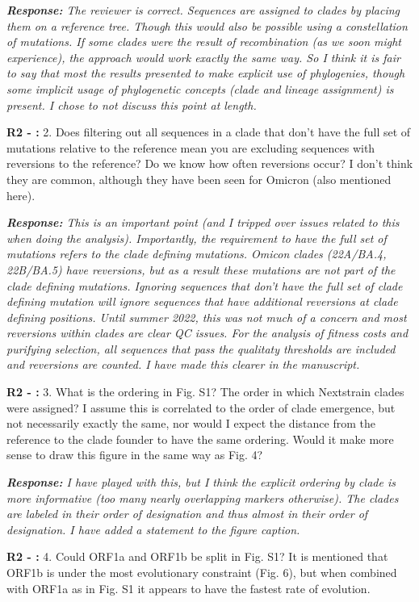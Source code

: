 \documentclass[aps,rmp,onecolumn]{revtex4-1}
\newcounter{counter1}[section]
\newcounter{counter2}[section]
\newcounter{counter3}[section]
\newcommand{\refb}[1]{\vskip 5mm \textbf{R2 - \stepcounter{counter2}\arabic{counter2}:} #1}
\newcommand{\response}[1]{{\it {\color{response}\textbf{Response:} #1}}\vskip 5mm}
\begin{document}
\response{The reviewer is correct. Sequences are assigned to clades by placing them on a reference tree.
Though this would also be possible using a constellation of mutations. If some clades were the result of recombination (as we soon might experience), the approach would work exactly the same way. So I think it is fair to say that most the results presented to make explicit use of phylogenies, though some implicit usage of phylogenetic concepts (clade and lineage assignment) is present. I chose to not discuss this point at length.  }

\refb{2. Does filtering out all sequences in a clade that don't have the full set of mutations relative to the reference mean you are excluding sequences with reversions to the reference? Do we know how often reversions occur? I don't think they are common, although they have been seen for Omicron (also mentioned here).}

\response{This is an important point (and I tripped over issues related to this when doing the analysis). Importantly, the requirement to have the full set of mutations refers to the clade defining mutations. Omicon clades (22A/BA.4, 22B/BA.5) have reversions, but as a result these mutations are not part of the clade defining mutations. Ignoring sequences that don't have the full set of clade defining mutation will ignore sequences that have additional reversions at clade defining positions. Until summer 2022, this was not much of a concern and most reversions within clades are clear QC issues. For the analysis of fitness costs and purifying selection, all sequences that pass the qualitaty thresholds are included and reversions are counted.
I have made this clearer in the manuscript.}

\refb{3. What is the ordering in Fig. S1? The order in which Nextstrain clades were assigned? I assume this is correlated to the order of clade emergence, but not necessarily exactly the same, nor would I expect the distance from the reference to the clade founder to have the same ordering. Would it make more sense to draw this figure in the same way as Fig. 4?}

\response{I have played with this, but I think the explicit ordering by clade is more informative (too many nearly overlapping markers otherwise). The clades are labeled in their order of designation and thus almost in their order of designation. I have added a statement to the figure caption. }

\refb{4. Could ORF1a and ORF1b be split in Fig. S1? It is mentioned that ORF1b is under the most evolutionary constraint (Fig. 6), but when combined with ORF1a as in Fig. S1 it appears to have the fastest rate of evolution.}
\end{document}
